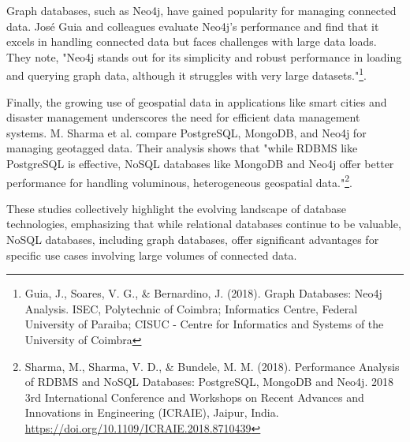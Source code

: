 Graph databases, such as Neo4j, have gained popularity for managing connected data. José Guia and colleagues evaluate Neo4j's performance and find that it excels in handling connected data but faces challenges with large data loads. They note, "Neo4j stands out for its simplicity and robust performance in loading and querying graph data, although it struggles with very large datasets."\footnote{Guia, J., Soares, V. G., \& Bernardino, J. (2018). Graph Databases: Neo4j Analysis. ISEC, Polytechnic of Coimbra; Informatics Centre, Federal University of Paraiba; CISUC - Centre for Informatics and Systems of the University of Coimbra}.

Finally, the growing use of geospatial data in applications like smart cities and disaster management underscores the need for efficient data management systems. M. Sharma et al. compare PostgreSQL, MongoDB, and Neo4j for managing geotagged data. Their analysis shows that "while RDBMS like PostgreSQL is effective, NoSQL databases like MongoDB and Neo4j offer better performance for handling voluminous, heterogeneous geospatial data."\footnote{Sharma, M., Sharma, V. D., \& Bundele, M. M. (2018). Performance Analysis of RDBMS and NoSQL Databases: PostgreSQL, MongoDB and Neo4j. 2018 3rd International Conference and Workshops on Recent Advances and Innovations in Engineering (ICRAIE), Jaipur, India. \url{https://doi.org/10.1109/ICRAIE.2018.8710439}}.

These studies collectively highlight the evolving landscape of database technologies, emphasizing that while relational databases continue to be valuable, NoSQL databases, including graph databases, offer significant advantages for specific use cases involving large volumes of connected data.







